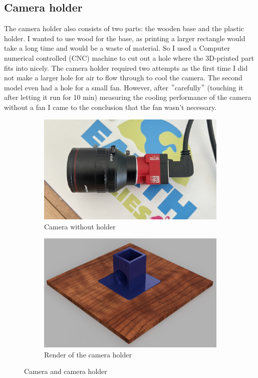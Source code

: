 \subsection{Camera holder}\label{subsec:camera-holder}
The camera holder also consists of two parts: the wooden base and the plastic holder.
I wanted to use wood for the base, as printing a larger rectangle would take a long time and would be a waste of material.
So I used a Computer numerical controlled (CNC) machine to cut out a hole where the 3D-printed part fits into nicely.
The camera holder required two attempts as the first time I did not make a larger hole for air to flow through to cool the camera.
The second model even had a hole for a small fan.
However, after \("\)carefully\("\) (touching it after letting it run for 10 min) measuring the cooling performance of the camera without a fan I came to the conclusion that the fan wasn't necessary.
\begin{figure}[H]
    \centering
    \begin{subfigure}{.5\textwidth}
        \centering
        \includegraphics[width=.8\textwidth]{../photos/cam}
        \caption[cam]{Camera without holder}
        \label{fig:cam}
    \end{subfigure}%
    \begin{subfigure}{.5\textwidth}
        \centering
        \includegraphics[width=.8\textwidth]{../photos/camholder_render}
        \caption[camholder]{Render of the camera holder}
        \label{fig:camholder_render}
    \end{subfigure}
    \caption{Camera and camera holder}
    \label{fig:camholder}
\end{figure}